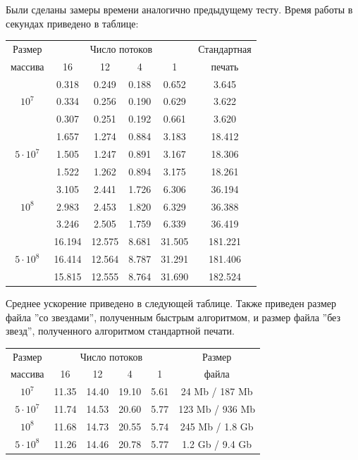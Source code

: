 \documentclass[specialist,subf,href,colorlinks=true,14pt
,times,mtpro,specialist
]{disser}
\begin{document}
Были сделаны замеры времени аналогично предыдущему тесту.
Время работы в секундах приведено в таблице:
\begin{center}
\begin{tabular}{||c|c|c|c|c|c||}
\hline
\hline
Размер & \multicolumn{4}{c|}{Число потоков} & Стандартная\\
\hhline{~|-|-|-|-|~|}
массива & 16 & 12 & 4 & 1 & печать \\
\hline
\hline
& 0.318 & 0.249 & 0.188 & 0.652 & 3.645 \\
\hhline{~|-|-|-|-|-|}
$10^7$ & 0.334 & 0.256 & 0.190 & 0.629 & 3.622 \\
\hhline{~|-|-|-|-|-|}
& 0.307 & 0.251 & 0.192 & 0.661 & 3.620 \\
\hline
& 1.657 & 1.274 & 0.884 & 3.183 & 18.412 \\
\hhline{~|-|-|-|-|-|}
$5 \cdot 10^7$ & 1.505 & 1.247 & 0.891 & 3.167 & 18.306 \\
\hhline{~|-|-|-|-|-|}
& 1.522 & 1.262 & 0.894 & 3.175 & 18.261 \\
\hline
& 3.105 & 2.441 & 1.726 & 6.306 & 36.194 \\
\hhline{~|-|-|-|-|-|}
$10^8$ & 2.983 & 2.453 & 1.820 & 6.329 & 36.388 \\
\hhline{~|-|-|-|-|-|}
& 3.246 & 2.505 & 1.759 & 6.339 &  36.419 \\
\hline
& 16.194 & 12.575 & 8.681 & 31.505 & 181.221 \\
\hhline{~|-|-|-|-|-|}
$5 \cdot 10^8$ & 16.414 & 12.564 & 8.787 & 31.291 & 181.406 \\
\hhline{~|-|-|-|-|-|}
& 15.815 & 12.555  & 8.764 & 31.690 & 182.524 \\
\hline
\hline
\end{tabular}
\end{center}
Среднее ускорение приведено в следующей таблице.
Также приведен размер файла ''со звездами'', полученным быстрым алгоритмом, и размер файла ''без звезд'', полученного алгоритмом стандартной печати.
\begin{center}
\begin{tabular}{||c|c|c|c|c|c||}
\hline
\hline
Размер & \multicolumn{4}{c|}{Число потоков} & Размер\\
\hhline{~|-|-|-|-|~|}
массива & 16 & 12 & 4 & 1 & файла \\
\hline
$10^7$  & 11.35 & 14.40 & 19.10 & 5.61 & 24 Mb / 187 Mb \\
\hline
$5 \cdot 10^7$ &11.74 & 14.53 & 20.60 & 5.77 & 123 Mb / 936 Mb\\
\hline
$10^8$ &11.68 & 14.73 & 20.55 & 5.74 & 245 Mb / 1.8 Gb \\
\hline
$5 \cdot 10^8$ &11.26 & 14.46 & 20.78 & 5.77 & 1.2 Gb / 9.4 Gb\\
\hline
\hline
\end{tabular}
\end{center}
\end{document}
